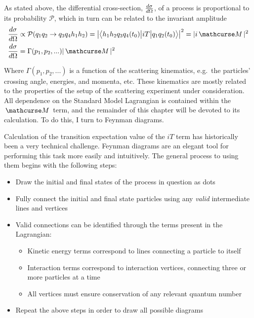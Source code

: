     As stated above, the differential cross-section, $\frac{d \sigma}{d \Omega}$,
        of a process is proportional to its probability $\mathcal{P}$,
        which in turn can be related to the invariant amplitude
    \begin{equation} \begin{split}
        \dXsec &\propto \mathcal{P}( q_{1} q_{2} \rightarrow q_{3} q_{4} h_1 h_2 ) 
            = \left| \TbraketA{ h_1 h_2 q_{3} q_{4} (t_0)}{iT}{q_{1} q_{2} (t_0)} \right|^2 
            = |i \invAmp|^2 
        \\\dXsec &= \Gamma(p_1, p_2, ...) |\invAmp|^2
    \end{split} \end{equation}

    Where $\Gamma(p_1, p_2, ...)$ is a function of the scattering kinematics,
        e.g.\ the particles' crossing angle, energies, and momenta, etc.
    These kinematics are mostly related to the properties of the setup of the scattering experiment under consideration.
    All dependence on the Standard Model Lagrangian is contained within the $\invAmp$ term,
        and the remainder of this chapter will be devoted to its calculation.
    To do this, I turn to Feynman diagrams.

    Calculation of the transition expectation value of the $iT$ term has historically been a very technical challenge.
    Feynman diagrams are an elegant tool for performing this task more easily and intuitively.
    The general process to using them begins with the following steps:
    \begin{itemize}
        \item Draw the initial and final states of the process in question as dots
        \item Fully connect the initial and final state particles using any \textit{valid} intermediate lines and vertices
        \item Valid connections can be identified through the terms present in the Lagrangian:
        \begin{itemize}
            \item Kinetic energy terms correspond to lines connecting a particle to itself
            \item Interaction terms correspond to interaction vertices, connecting three or more particles at a time
            \item All vertices must ensure conservation of any relevant quantum number
        \end{itemize}
        \item Repeat the above steps in order to draw all possible diagrams
    \end{itemize}

